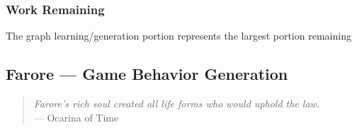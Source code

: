 \documentclass[a4paper]{article}
\begin{document}
\subsubsection{Work Remaining}

The graph learning/generation portion represents the largest portion remaining 

\subsection{Farore --- Game Behavior Generation}
\begin{quotation}
\textit{Farore's rich soul created all life forms who would uphold the law.}  \\ \indent \indent --- Ocarina of Time
\end{quotation}



\end{document}

